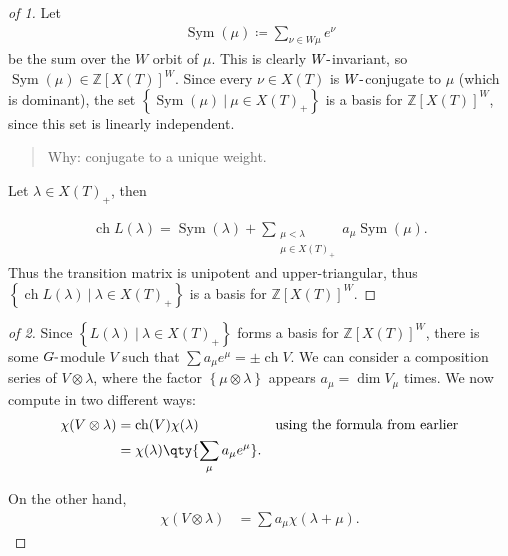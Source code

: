 \begin{proof}[of 1]

Let
\begin{align*}
\operatorname{Sym}(\mu) \coloneqq\sum_{\nu \in W\mu} e^\nu
\end{align*}
be the sum over the \(W\) orbit of \(\mu\). This is clearly
\(W{\hbox{-}}\)invariant, so
\(\operatorname{Sym}(\mu) \in {\mathbb{Z}}[X(T)]^W\). Since every
\(\nu \in X(T)\) is \(W{\hbox{-}}\)conjugate to \(\mu\) (which is
dominant), the set
\(\left\{{\operatorname{Sym}(\mu) {~\mathrel{\Big|}~}\mu \in X(T)_+}\right\}\)
is a basis for \({\mathbb{Z}}[X(T)]^W\), since this set is linearly
independent.

\begin{quote}
Why: conjugate to a unique weight.
\end{quote}

Let \(\lambda \in X(T)_+\), then

\begin{align*}
\operatorname{ch}L(\lambda) = \operatorname{Sym}(\lambda) + \sum_{\substack{\mu < \lambda \\ \mu \in X(T)_+} } a_\mu \operatorname{Sym}(\mu)
.\end{align*}
Thus the transition matrix is unipotent and upper-triangular, thus
\(\left\{{\operatorname{ch}L(\lambda) {~\mathrel{\Big|}~}\lambda \in X(T)_+}\right\}\)
is a basis for \({\mathbb{Z}}[X(T)]^W\).

\end{proof}

\begin{proof}[of 2]

Since
\(\left\{{L(\lambda) {~\mathrel{\Big|}~}\lambda\in X(T)_+}\right\}\)
forms a basis for \({\mathbb{Z}}[X(T)]^W\), there is some
\(G{\hbox{-}}\)module \(V\) such that
\(\sum a_\mu e^\mu = \pm \operatorname{ch}V\). We can consider a
composition series of \(V\otimes\lambda\), where the factor
\(\left\{{\mu \otimes\lambda}\right\}\) appears \(a_\mu = \dim V_\mu\)
times. We now compute in two different ways:
\begin{align*}  
\chi(V\otimes\lambda) 
&= \operatorname{ch}(V) \chi(\lambda)  && \text{using the formula from earlier} \\
&= \chi(\lambda) \qty{ \sum_\mu a_\mu e^\mu }
.\end{align*}

On the other hand,
\begin{align*}  
\chi(V\otimes\lambda) &=
\sum a_\mu \chi(\lambda + \mu)
.\end{align*}

\end{proof}

